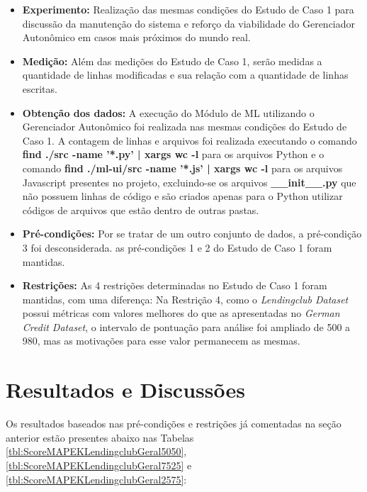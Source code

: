 \documentclass[Portugues,Final]{ic-tese-v3}
\begin{document}
\begin{itemize}
\item \textbf{Experimento:} Realização das mesmas condições do Estudo de Caso 1 para discussão da manutenção do sistema e reforço da viabilidade do Gerenciador Autonômico em casos mais próximos do mundo real.

\item \textbf{Medição:} Além das medições do Estudo de Caso 1, serão medidas a quantidade de linhas modificadas e sua relação com a quantidade de linhas escritas.

\item \textbf{Obtenção dos dados:} A execução do Módulo de ML utilizando o Gerenciador Autonômico foi realizada nas mesmas condições do Estudo de Caso 1. A contagem de linhas e arquivos foi realizada executando o comando \textbf{find ./src -name '*.py' | xargs wc -l} para os arquivos Python e o comando \textbf{find ./ml-ui/src -name '*.js' | xargs wc -l} para os arquivos Javascript presentes no projeto, excluindo-se os arquivos \textbf{\_\_init\_\_.py} que não possuem linhas de código e são criados apenas para o Python utilizar códigos de arquivos que estão dentro de outras pastas.

\item \textbf{Pré-condições:} Por se tratar de um outro conjunto de dados, a pré-condição 3 foi desconsiderada. as pré-condições 1 e 2 do Estudo de Caso 1 foram mantidas.

\item \textbf{Restrições:} As 4 restrições determinadas no Estudo de Caso 1 foram mantidas, com uma diferença: Na Restrição 4, como o \textit{Lendingclub Dataset} possui métricas com valores melhores do que as apresentadas no \textit{German Credit Dataset}, o intervalo de pontuação para análise foi ampliado de 500 a 980, mas as motivações para esse valor permanecem as mesmas.
\end{itemize}

\section{Resultados e Discussões}

Os resultados baseados nas pré-condições e restrições já comentadas na seção anterior estão presentes abaixo nas Tabelas \ref{tbl:ScoreMAPEKLendingclubGeral5050}, \ref{tbl:ScoreMAPEKLendingclubGeral7525} e \ref{tbl:ScoreMAPEKLendingclubGeral2575}:
\end{document}

